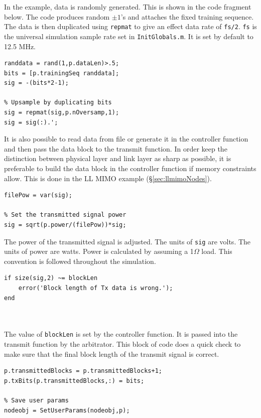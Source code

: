 In the example, data is randomly generated.  This is shown in the
code fragment below.  The code produces random $\pm 1$'s and
attaches the fixed training sequence.  The data is then duplicated
using \verb+repmat+ to give an effect data rate of \verb+fs/2+.
\verb+fs+ is the universal simulation sample rate set in
\verb+InitGlobals.m+. It is set by default to 12.5 MHz.

\begin{lstlisting}[name=bpskTx]
% Make some random data and attach training sequence
randdata = rand(1,p.dataLen)>.5;
bits = [p.trainingSeq randdata];
sig = -(bits*2-1);

% Upsample by duplicating bits
sig = repmat(sig,p.nOversamp,1);
sig = sig(:).';

\end{lstlisting}

It is also possible to read data from file or generate it in the
controller function and then pass the data block to the transmit
function.  In order keep the distinction between physical layer and
link layer as sharp as possible, it is preferable to build the data
block in the controller function if memory constraints allow.  This
is done in the LL MIMO example (\S\ref{sec:llmimoNodes}).

\begin{lstlisting}[name=bpskTx]
% Calculate signal power (Watts)
filePow = var(sig);

% Set the transmitted signal power
sig = sqrt(p.power/(filePow))*sig;

\end{lstlisting}

The power of the transmitted signal is adjusted.  The units of
\verb+sig+ are volts.  The units of power are watts.  Power is
calculated by assuming a 1$\Omega$ load.  This convention is
followed throughout the simulation.

\begin{lstlisting}[name=bpskTx]
% Check blockLen
if size(sig,2) ~= blockLen
    error('Block length of Tx data is wrong.');
end



\end{lstlisting}

The value of \verb+blockLen+ is set by the controller function.  It
is passed into the transmit function by the arbitrator.  This block
of code does a quick check to make sure that the final block length
of the transmit signal is correct.

\begin{lstlisting}[name=bpskTx]
% Save txbits
p.transmittedBlocks = p.transmittedBlocks+1;
p.txBits(p.transmittedBlocks,:) = bits;

% Save user params
nodeobj = SetUserParams(nodeobj,p);
\end{lstlisting}

